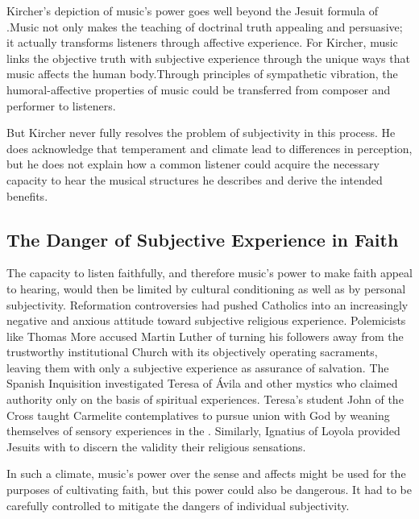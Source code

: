 Kircher's depiction of music's power goes well beyond the Jesuit formula of .
Music not only makes the teaching of doctrinal truth appealing and persuasive; it actually transforms listeners through affective experience.
For Kircher, music links the objective truth with subjective experience through the unique ways that music affects the human body.
Through principles of sympathetic vibration, the humoral-affective properties of music could be transferred from composer and performer to listeners.

But Kircher never fully resolves the problem of subjectivity in this process. 
He does acknowledge that temperament and climate lead to differences in perception, but he does not explain how a common listener could acquire the necessary capacity to hear the musical structures he describes and derive the intended benefits.

\subsection{The Danger of Subjective Experience in Faith}

The capacity to listen faithfully, and therefore music's power to make faith appeal to hearing, would then be limited by cultural conditioning as well as by personal subjectivity.
Reformation controversies had pushed Catholics into an increasingly negative and anxious attitude toward subjective religious experience.
Polemicists like Thomas More accused Martin Luther of turning his followers away from the trustworthy institutional Church with its objectively operating sacraments, leaving them with only a subjective experience as assurance of salvation.%
\autocite[\XXX, also More]{Schreiner:Certainty}
The Spanish Inquisition investigated Teresa of Ávila and other mystics who claimed authority only on the basis of spiritual experiences.%
\autocites[\XXX]{Ahlgren:TeresaPolitics}{Francisca:Inquisition}
Teresa's student John of the Cross taught Carmelite contemplatives to pursue union with God by weaning themselves of sensory experiences in the .
Similarly, Ignatius of Loyola provided Jesuits with  to discern the validity their religious sensations.

In such a climate, music's power over the sense and affects might be used for the purposes of cultivating faith, but this power could also be dangerous.
It had to be carefully controlled to mitigate the dangers of individual subjectivity.

